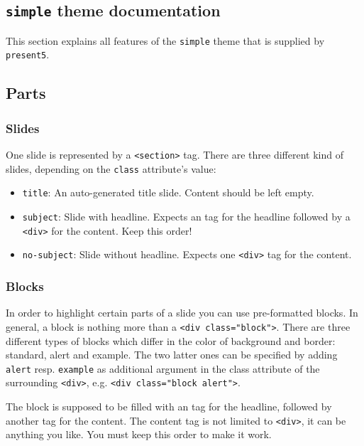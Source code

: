 \documentclass{scrartcl}
\newcommand{\present}{\code{present5}}
\newcommand{\code}[1]{{\tt #1}}
\newcommand{\tag}[1]{\code{<#1>}}
\begin{document}
\begin{appendix}
\section{\code{simple} theme documentation}
\label{sec:simpleThemeDocumentation}

This section explains all features of the \code{simple} theme that is supplied by \present.

\subsection{Parts}
\label{subsection:parts}


\subsubsection{Slides}
\label{subsubsection:slides}

One slide is represented by a \tag{section} tag. There are three different kind of slides, depending on the \code{class} attribute's value:
\begin{itemize}
\item \code{title}: An auto-generated title slide. Content should be left empty.
\item \code{subject}: Slide with headline. Expects an \tag{h1} tag for the headline followed by a \tag{div} for the content. Keep this order!
\item \code{no-subject}: Slide without headline. Expects one \tag{div} tag for the content.
\end{itemize}


\subsubsection{Blocks}
\label{subsubsection:blocks}

In order to highlight certain parts of a slide you can use pre-formatted blocks. In general, a block is nothing more than a \tag{div class="block"}. There are three different types of blocks which differ in the color of background and border: standard, alert and example. The two latter ones can be specified by adding \code{alert} resp. \code{example} as additional argument in the class attribute of the surrounding \tag{div}, e.g. \tag{div class="block alert"}.

The block is supposed to be filled with an \tag{h1} tag for the headline, followed by another tag for the content. The content tag is not limited to \tag{div}, it can be anything you like. You must keep this order to make it work.
 


\end{appendix}
\end{document}
